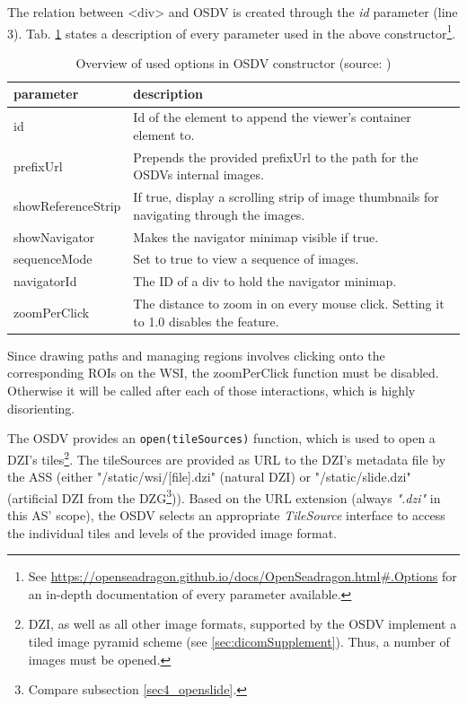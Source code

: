 The relation between \textless{div}{\textgreater} and OSDV is created through the \emph{id} parameter (line 3). Tab. \ref{tab4_osdvParams} states a description of every parameter used in the above constructor\footnote{
	See \url{https://openseadragon.github.io/docs/OpenSeadragon.html\#.Options} for an in-depth documentation of every parameter available.
}.
\begin{table}[H]
	\begin{center}
		\begin{tabular}{| p{3.5cm} | p{6.5cm} |}
			\hline
			\textbf{parameter} & \textbf{description}\\ \hline
			id & Id of the element to append the viewer's container element to.\\ \hline
			prefixUrl & Prepends the provided prefixUrl to the path for the OSDVs internal images.\\ \hline
			showReferenceStrip & If true, display a scrolling strip of image thumbnails for navigating through the images.\\ \hline
			showNavigator & Makes the navigator minimap visible if true. \\ \hline
			sequenceMode & Set to true to view a sequence of images.\\ \hline
			navigatorId & The ID of a div to hold the navigator minimap.\\ \hline
			zoomPerClick & The distance to zoom in on every mouse click. Setting it to 1.0 disables the feature.\\ \hline
		\end{tabular}
		\caption{Overview of used options in OSDV constructor (source: \cite{web:openseadragon})}
		\label{tab4_osdvParams}
	\end{center}
\end{table}

Since drawing paths and managing regions involves clicking onto the corresponding ROIs on the WSI, the zoomPerClick function must be disabled. Otherwise it will be called after each of those interactions, which is highly disorienting.

The OSDV provides an \texttt{open(tileSources)} function, which is used to open a DZI's tiles\footnote{
	DZI, as well as all other image formats, supported by the OSDV implement a tiled image pyramid scheme (see \ref{sec:dicomSupplement}). Thus, a number of images must be opened.
}. The tileSources are provided as URL to the DZI's metadata file by the ASS (either "/static/wsi/[file].dzi" (natural DZI) or "/static/slide.dzi" (artificial DZI from the DZG\footnote{
	Compare subsection \ref{sec4_openslide}.
})). Based on the URL extension (always \emph{".dzi"} in this AS' scope), the OSDV selects an appropriate \emph{TileSource} interface to access the individual tiles and levels of the provided image format.


